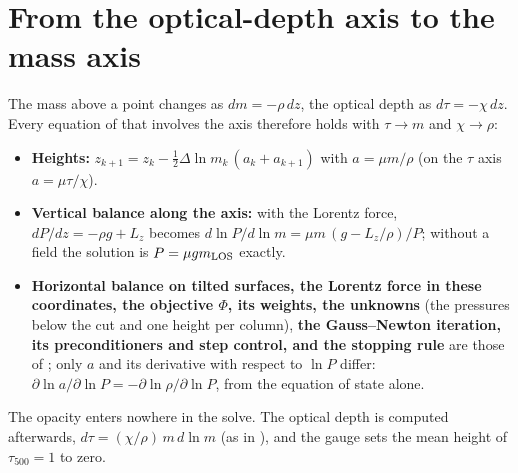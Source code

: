 


\begin{abstract}
\noindent With $T$ and $\B$ given on surfaces of constant column mass $m$, this mode computes the gas pressure on every surface and
the height of every surface in every column so that pressure, gravity and the Lorentz force of the given field balance as well as
possible in all three directions, below a cut in $m$; above the cut the columns keep the hydrostatic pressure $P=gm$. It is the
least-squares problem of  with the optical depth replaced by the column mass.
\end{abstract}

\section{From the optical-depth axis to the mass axis}
The mass above a point changes as $dm=-\rho\,dz$, the optical depth as $d\tau=-\chi\,dz$. Every equation of 
that involves the axis therefore holds with $\tau\to m$ and $\chi\to\rho$:
\begin{itemize}
\item \textbf{Heights:} $z_{k+1}=z_k-\tfrac12\Delta\ln m_k\,(a_k+a_{k+1})$ with $a=\mu m/\rho$ (on the $\tau$ axis $a=\mu\tau/\chi$).
\item \textbf{Vertical balance along the axis:} with the Lorentz force, $dP/dz=-\rho g+L_z$ becomes
$d\ln P/d\ln m=\mu m\,(g-L_z/\rho)/P$; without a field the solution is $P=\mu g m_{\rm LOS}$ exactly.
\item \textbf{Horizontal balance on tilted surfaces, the Lorentz force in these coordinates, the objective $\Phi$, its weights, the
unknowns} (the pressures below the cut and one height per column), \textbf{the Gauss--Newton iteration, its preconditioners and
step control, and the stopping rule} are those of ; only $a$ and its derivative with respect to $\ln P$
differ: $\partial\ln a/\partial\ln P=-\partial\ln\rho/\partial\ln P$, from the equation of state alone.
\end{itemize}
The opacity enters nowhere in the solve. The optical depth is computed afterwards, $d\tau=(\chi/\rho)\,m\,d\ln m$ (as in
), and the gauge sets the mean height of $\tau_{500}=1$ to zero.

